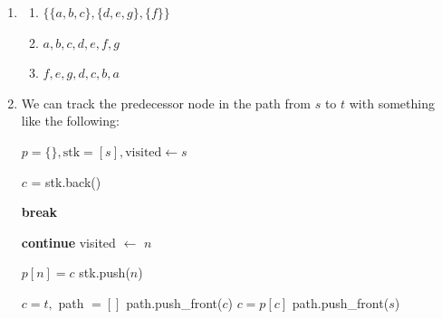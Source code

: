 \documentclass[12pt]{article}
\begin{document}
\begin{enumerate}
  \item
    \begin{enumerate}
      \item $\{\{a, b, c\}, \{d, e, g\}, \{f\}\}$

      \item $a, b, c, d, e, f, g$

      \item $f, e, g, d, c, b, a$
    \end{enumerate}

  \item We can track the predecessor node in the path from $s$ to $t$
    with something like the following:

    \begin{algorithm}
      \caption{DFS with path tracking}
      \begin{algorithmic}
        \State $p = \{\}, \text{stk} = [s], \text{visited} \gets s$

        \vspace{3mm}

        \State $c$ = stk.back()

        \vspace{3mm}

        \State \textbf{break}
        \EndIf

        \vspace{3mm}

        \State \textbf{continue}
        \EndIf
        \State visited $\gets$ $n$

        \vspace{3mm}

        \State $p[n] = c$
        \State stk.push($n$)
        \EndFor
        \EndWhile

        \vspace{3mm}

        \State {} 
        \EndIf

        \vspace{6mm}

        \State $c = t, $ path $= []$ 
        \State path.push\_front($c$)
        \State $c = p[c]$
        \EndWhile
        \State path.push\_front($s$)


\end{algorithmic}
\end{algorithm}
\end{enumerate}
\end{document}
